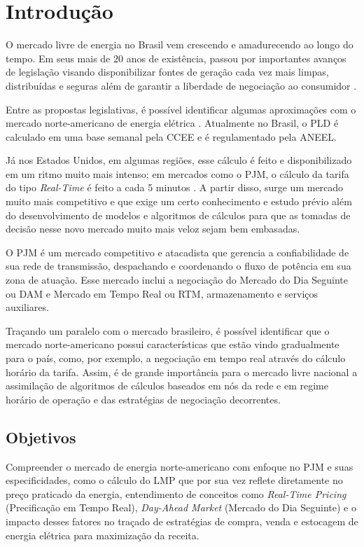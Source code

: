 \chapter[Introdução]{Introdução}
\label{intro}

O mercado livre de energia no Brasil vem crescendo e amadurecendo ao longo do tempo. Em seus mais de 20 anos de existência, passou por importantes avanços de legislação visando disponibilizar fontes de geração cada vez mais limpas, distribuídas e seguras além de garantir a liberdade de negociação ao consumidor \cite{folha2018ml}. 

Entre as propostas legislativas, é possível identificar algumas aproximações com o mercado norte-americano de energia elétrica \cite{ccee2018}. Atualmente no Brasil, o \ac{PLD} é calculado em uma base semanal pela \ac{CCEE} e é regulamentado pela \ac{ANEEL}. 

Já nos Estados Unidos, em algumas regiões, esse cálculo é feito e disponibilizado em um ritmo muito mais intenso; em mercados como o PJM, o cálculo da tarifa do tipo \textit{Real-Time} é feito a cada 5 minutos \cite{pjmEnergyMarket}. A partir disso, surge um mercado muito mais competitivo e que exige um certo conhecimento e estudo prévio além do desenvolvimento de modelos e algoritmos de cálculos para que as tomadas de decisão nesse novo mercado muito mais veloz sejam bem embasadas.

O PJM é um mercado competitivo e atacadista que gerencia a confiabilidade de sua rede de transmissão, despachando e coordenando o fluxo de potência em sua zona de atuação. Esse mercado inclui a negociação do Mercado do Dia Seguinte ou \ac{DAM} e Mercado em Tempo Real ou \ac{RTM}, armazenamento e serviços auxiliares. \cite{fercPJM}

Traçando um paralelo com o mercado brasileiro, é possível identificar que o mercado norte-americano possui características que estão vindo gradualmente para o país, como, por exemplo, a negociação em tempo real através do cálculo horário da tarifa. Assim, é de grande importância para o mercado livre nacional a assimilação de algoritmos de cálculos baseados em nós da rede e em regime horário de operação e das estratégias de negociação decorrentes.

\section{Objetivos}

Compreender o mercado de energia norte-americano com enfoque no PJM e suas especificidades, como o cálculo do \ac{LMP} que por sua vez reflete diretamente no preço praticado da energia, entendimento de conceitos como \textit{Real-Time Pricing} (Precificação em Tempo Real), \textit{Day-Ahead Market} (Mercado do Dia Seguinte) e o impacto desses fatores no traçado de estratégias de compra, venda e estocagem de energia elétrica para maximização da receita. 

